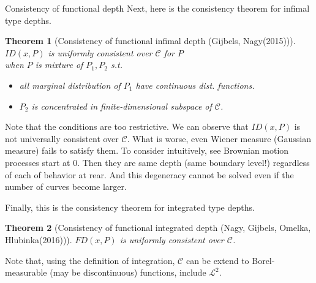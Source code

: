 \documentclass[aspectratio=169,ignorenonframetext,9pt]{beamer}
\theoremstyle{plain}
\newtheorem{thm}{Theorem}[section]
\theoremstyle{definition}
\begin{document}
\begin{frame}{Consistency of functional depth}
Next, here is the consistency theorem for infimal type depths.
\begin{thm}[Consistency of functional infimal depth (Gijbels, Nagy(2015))]
    $ID(x,P)$ is uniformly consistent over $\mathcal{C}$ for $P$ \\ 
    when $P$ is mixture of $P_1,P_2$ s.t.
    \begin{itemize}
        \item all marginal distribution of $P_1$ have continuous dist. functions.
        \item $P_2$ is concentrated in finite-dimensional subspace of $\mathcal{C}$.
    \end{itemize}
\end{thm}
Note that the conditions are too restrictive. We can observe that $ID(x,P)$ is not universally consistent over $\mathcal{C}$.
What is worse, even Wiener measure (Gaussian measure) fails to satisfy them.
To consider intuitively, see Brownian motion processes start at 0. Then they are
same depth (same boundary level!) regardless of each of behavior at rear.
And this degeneracy cannot be solved even if the number of curves become larger.

Finally, this is the consistency theorem for integrated type depths.
\begin{thm}[Consistency of functional integrated depth (Nagy, Gijbels, Omelka, Hlubinka(2016))]
        $FD(x,P)$ is uniformly consistent over $\mathcal{C}$.
\end{thm}
Note that, using the definition of integration, $\mathcal{C}$ can be extend to
Borel-measurable (may be discontinuous) functions, include $\mathcal{L}^2$.
\end{frame}
\end{document}
